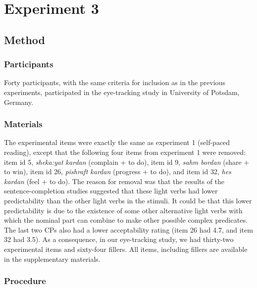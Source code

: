 \documentclass{frontiersSCNS}\usepackage{knitr} %
\begin{document}
\section{Experiment 3}

\subsection{Method}
\subsubsection{Participants}

Forty participants, with the same criteria for inclusion as in the previous experiments, participated in the eye-tracking study in University of Potsdam, Germany. 

\subsubsection{Materials}

The experimental items were exactly the same as experiment 1 (self-paced reading), except that the 
following four items from experiment 1 were removed: item id 5, \textit{sheka:yat kardan} (complain + to do), item id 9, \textit{sahm bordan} (share + to win), item id 26, \textit{pishraft kardan} (progress + to do), and item id 32, \textit{hes kardan} (feel + to do). The reason for removal was that the results of the sentence-completion studies suggested that these light verbs had lower predictability than the other light verbs in the stimuli. It could be that this lower predictability is due to the existence of some other alternative light verbs with which the nominal part can combine to make other possible complex predicates. The last two CPs also had a lower acceptability rating (item 26 had 4.7, and item 32 had 3.5). As a consequence, in our eye-tracking study, we had thirty-two experimental items and sixty-four fillers. All items, including fillers are available in the supplementary materials.

\subsubsection{Procedure}
\end{document}

